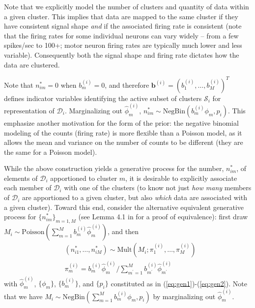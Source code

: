 \documentclass[journal]{IEEEtran}
\newcommand{\beqs}{\begin{eqnarray}}
\newcommand{\eeqs}{\end{eqnarray}}
\newcommand{\bv}{\boldsymbol{b}}
\begin{document}
Note that we explicitly model the number of clusters and quantity of data within a given cluster. This implies that data are mapped to the same cluster if they have consistent signal shape \emph{and} if the associated firing rate is consistent (note that the firing rates for some individual neurons can vary widely -- from a few spikes/sec to 100+; motor neuron firing rates are typically much lower and less variable). Consequently both the signal shape and firing rate dictates how the data are clustered.

Note that $n_{im}^*=0$ when $b_m^{(i)}=0$, and therefore $\bv^{(i)}=(b_1^{(i)},\dots,b_M^{(i)})^T$ defines indicator variables identifying the active subset of clusters $\mathcal{S}_i$ for representation of $\bm{\mathcal{D}}_i$. Marginalizing out $\hat{\phi}_m^{(i)}$, $n_{im}^*\sim\mbox{NegBin}(b_m^{(i)}{\phi}_m,p_i)$. This emphasize another motivation for the form of the prior: the negative binomial modeling of the counts (firing rate) is more flexible than a Poisson model, as it allows the mean and variance on the number of counts to be different (they are the same for a Poisson model).


While the above construction yields a generative process for the number, $n_{im}^*$, of elements of $\bm{\mathcal{D}}_i$ apportioned to cluster $m$, it is desirable to explicitly associate each member of $\bm{\mathcal{D}}_i$ with one of the clusters (to know not just \emph{how many} members of $\bm{\mathcal{D}}_i$ are apportioned to a given cluster, but also \emph{which} data are associated with a given cluster). Toward this end, consider the alternative equivalent generative process for $\{n_{im}^*\}_{m=1,M}$ (see Lemma 4.1 in \cite{Mingyuan2012} for a proof of equivalence): first draw
$M_i\sim\mbox{Poisson}(\sum_{m=1}^M b_m^{(i)}\hat{\phi}_m^{(i)})$, %
 and then
\beqs & (n_{i1}^*,\dots,n_{iM}^*)\sim\mbox{Mult}(M_i;\pi_1^{(i)},\dots,\pi_M^{(i)})\\ &\pi_m^{(i)}=b_m^{(i)}\hat{\phi}_m^{(i)}/\sum_{m^\prime=1}^M b_{m^\prime}^{(i)}\hat{\phi}_{m^\prime}^{(i)}\label{eq:mixt}\eeqs
with $\hat{\phi}_m^{(i)}$, $\{{\phi}_m\}$, $\{b_m^{(i)}\}$, and $\{p_i\}$ constituted as in (\ref{eq:gen1})-(\ref{eq:gen2}). Note that we have $M_i\sim\mbox{NegBin}(\sum_{m=1}^M b_m^{(i)}{\phi}_m,p_i)$ by marginalizing out $\hat{\phi}_m^{(i)}$.
\end{document}
